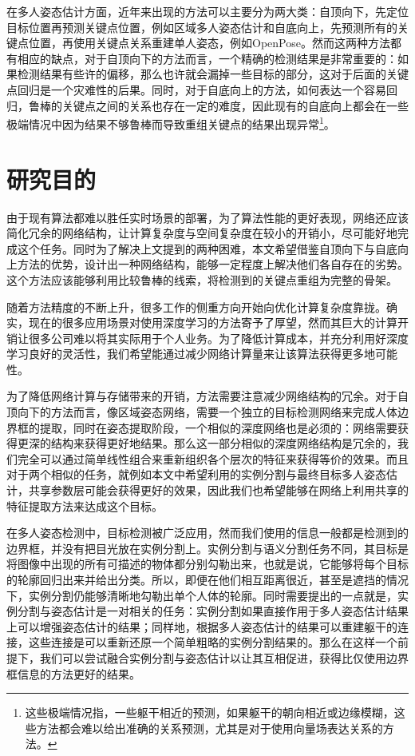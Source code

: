 在多人姿态估计方面，近年来出现的方法可以主要分为两大类：自顶向下，先定位目标位置再预测关键点位置，例如区域多人姿态估计\cite{fang2017rmpe}和自底向上，先预测所有的关键点位置，再使用关键点关系重建单人姿态，例如OpenPose\cite{Cao2016Realtime}。然而这两种方法都有相应的缺点，对于自顶向下的方法而言，一个精确的检测结果是非常重要的：如果检测结果有些许的偏移，那么也许就会漏掉一些目标的部分，这对于后面的关键点回归是一个灾难性的后果。同时，对于自底向上的方法，如何表达一个容易回归，鲁棒的关键点之间的关系也存在一定的难度，因此现有的自底向上都会在一些极端情况中因为结果不够鲁棒而导致重组关键点的结果出现异常\footnote{这些极端情况指，一些躯干相近的预测，如果躯干的朝向相近或边缘模糊，这些方法都会难以给出准确的关系预测，尤其是对于使用向量场表达关系的方法。}。

\section{研究目的}
\label{sec:generalmotivation}
由于现有算法都难以胜任实时场景的部署，为了算法性能的更好表现，网络还应该简化冗余的网络结构，让计算复杂度与空间复杂度在较小的开销小，尽可能好地完成这个任务。同时为了解决上文提到的两种困难，本文希望借鉴自顶向下与自底向上方法的优势，设计出一种网络结构，能够一定程度上解决他们各自存在的劣势。这个方法应该能够利用比较鲁棒的线索，将检测到的关键点重组为完整的骨架。

随着方法精度的不断上升，很多工作的侧重方向开始向优化计算复杂度靠拢。确实，现在的很多应用场景对使用深度学习的方法寄予了厚望，然而其巨大的计算开销让很多公司难以将其实际用于个人业务。为了降低计算成本，并充分利用好深度学习良好的灵活性，我们希望能通过减少网络计算量来让该算法获得更多地可能性。

为了降低网络计算与存储带来的开销，方法需要注意减少网络结构的冗余。对于自顶向下的方法而言，像区域姿态网络\cite{fang2017rmpe}，需要一个独立的目标检测网络来完成人体边界框的提取，同时在姿态提取阶段，一个相似的深度网络也是必须的：网络需要获得更深的结构来获得更好地结果。那么这一部分相似的深度网络结构是冗余的，我们完全可以通过简单线性组合来重新组织各个层次的特征来获得等价的效果。而且对于两个相似的任务，就例如本文中希望利用的实例分割与最终目标多人姿态估计，共享参数层可能会获得更好的效果，因此我们也希望能够在网络上利用共享的特征提取方法来达成这个目标。

在多人姿态检测中，目标检测被广泛应用，然而我们使用的信息一般都是检测到的边界框，并没有把目光放在实例分割上。实例分割与语义分割任务不同，其目标是将图像中出现的所有可描述的物体都分别勾勒出来，也就是说，它能够将每个目标的轮廓回归出来并给出分类。所以，即便在他们相互距离很近，甚至是遮挡的情况下，实例分割仍能够清晰地勾勒出单个人体的轮廓。同时需要提出的一点就是，实例分割与姿态估计是一对相关的任务：实例分割如果直接作用于多人姿态估计结果上可以增强姿态估计的结果；同样地，根据多人姿态估计的结果可以重建躯干的连接，这些连接是可以重新还原一个简单粗略的实例分割结果的。那么在这样一个前提下，我们可以尝试融合实例分割与姿态估计以让其互相促进，获得比仅使用边界框信息的方法更好的结果。


